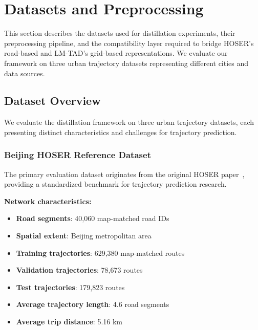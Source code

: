 
\section{Datasets and Preprocessing}
\label{sec:data-preprocessing}

This section describes the datasets used for distillation experiments, their preprocessing pipeline, and the compatibility layer required to bridge HOSER's road-based and LM-TAD's grid-based representations. We evaluate our framework on three urban trajectory datasets representing different cities and data sources.

\subsection{Dataset Overview}
\label{sec:data-overview}

We evaluate the distillation framework on three urban trajectory datasets, each presenting distinct characteristics and challenges for trajectory prediction.

\subsubsection{Beijing HOSER Reference Dataset}

The primary evaluation dataset originates from the original HOSER paper~\cite{yangHOSERHigherorderStructureaware2023}, providing a standardized benchmark for trajectory prediction research.

\textbf{Network characteristics:}
\begin{itemize}[noitemsep,topsep=0pt]
\item \textbf{Road segments}: 40,060 map-matched road IDs
\item \textbf{Spatial extent}: Beijing metropolitan area
\item \textbf{Training trajectories}: 629,380 map-matched routes
\item \textbf{Validation trajectories}: 78,673 routes
\item \textbf{Test trajectories}: 179,823 routes
\item \textbf{Average trajectory length}: 4.6 road segments
\item \textbf{Average trip distance}: 5.16 km
\end{itemize}

